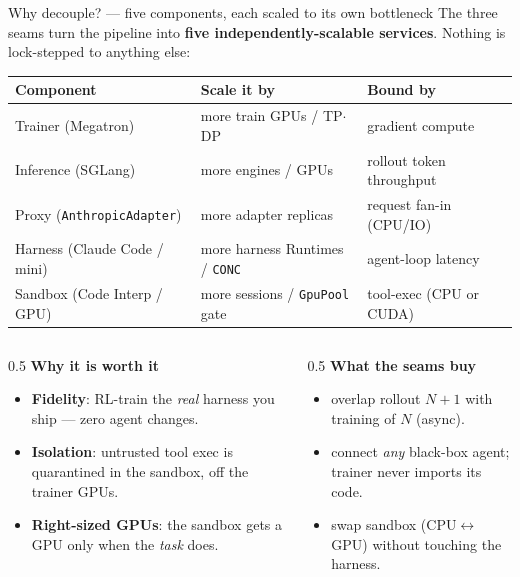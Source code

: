 \documentclass[aspectratio=169]{beamer}
\begin{document}
\begin{frame}{Why decouple? --- five components, each scaled to its own bottleneck}
  \footnotesize The three seams turn the pipeline into \textbf{five independently-scalable
  services}. Nothing is lock-stepped to anything else:
  \begin{center}
  \renewcommand{\arraystretch}{1.15}\scriptsize
  \begin{tabular}{lll}
    \toprule
    \textbf{Component} & \textbf{Scale it by} & \textbf{Bound by} \\
    \midrule
    Trainer (Megatron)        & more train GPUs / TP$\cdot$DP      & gradient compute \\
    Inference (SGLang)        & more engines / GPUs                & rollout token throughput \\
    Proxy (\texttt{AnthropicAdapter}) & more adapter replicas      & request fan-in (CPU/IO) \\
    Harness (Claude Code / mini)     & more harness Runtimes / \texttt{CONC} & agent-loop latency \\
    Sandbox (Code Interp / GPU)      & more sessions / \texttt{GpuPool} gate & tool-exec (CPU or CUDA) \\
    \bottomrule
  \end{tabular}
  \end{center}
  \vspace{0.2em}
  \begin{columns}[T]
    \begin{column}{0.5\textwidth}
      \textbf{Why it is worth it}
      \begin{itemize}\setlength\itemsep{0.1em}
        \item \textbf{Fidelity}: RL-train the \emph{real} harness you ship --- zero agent changes.
        \item \textbf{Isolation}: untrusted tool exec is quarantined in the sandbox, off the
          trainer GPUs.
        \item \textbf{Right-sized GPUs}: the sandbox gets a GPU only when the \emph{task} does.
      \end{itemize}
    \end{column}
    \begin{column}{0.5\textwidth}
      \textbf{What the seams buy}
      \begin{itemize}\setlength\itemsep{0.1em}
        \item {} overlap rollout $N{+}1$ with training of $N$ (async).
        \item {} connect \emph{any} black-box agent; trainer never imports its code.
        \item {} swap sandbox (CPU$\leftrightarrow$GPU) without touching the harness.
      \end{itemize}
    \end{column}
  \end{columns}
\end{frame}
\end{document}
